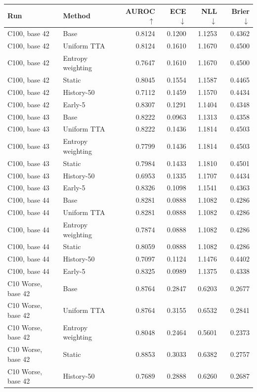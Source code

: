 \begin{tabular}{llrrrr}
\toprule
Run & Method & AUROC $\uparrow$ & ECE $\downarrow$ & NLL $\downarrow$ & Brier $\downarrow$ \\
\midrule
C100, base 42 & Base & 0.8124 & 0.1200 & 1.1253 & 0.4362 \\
C100, base 42 & Uniform TTA & 0.8124 & 0.1610 & 1.1670 & 0.4500 \\
C100, base 42 & Entropy weighting & 0.7647 & 0.1610 & 1.1670 & 0.4500 \\
C100, base 42 & Static & 0.8045 & 0.1554 & 1.1587 & 0.4465 \\
C100, base 42 & History-50 & 0.7112 & 0.1459 & 1.1570 & 0.4434 \\
C100, base 42 & Early-5 & 0.8307 & 0.1291 & 1.1404 & 0.4348 \\
C100, base 43 & Base & 0.8222 & 0.0963 & 1.1313 & 0.4358 \\
C100, base 43 & Uniform TTA & 0.8222 & 0.1436 & 1.1814 & 0.4503 \\
C100, base 43 & Entropy weighting & 0.7799 & 0.1436 & 1.1814 & 0.4503 \\
C100, base 43 & Static & 0.7984 & 0.1433 & 1.1810 & 0.4501 \\
C100, base 43 & History-50 & 0.6953 & 0.1335 & 1.1707 & 0.4434 \\
C100, base 43 & Early-5 & 0.8326 & 0.1098 & 1.1541 & 0.4363 \\
C100, base 44 & Base & 0.8281 & 0.0888 & 1.1082 & 0.4286 \\
C100, base 44 & Uniform TTA & 0.8281 & 0.0888 & 1.1082 & 0.4286 \\
C100, base 44 & Entropy weighting & 0.7874 & 0.0888 & 1.1082 & 0.4286 \\
C100, base 44 & Static & 0.8059 & 0.0888 & 1.1082 & 0.4286 \\
C100, base 44 & History-50 & 0.7097 & 0.1124 & 1.1476 & 0.4402 \\
C100, base 44 & Early-5 & 0.8325 & 0.0989 & 1.1375 & 0.4338 \\
C10 Worse, base 42 & Base & 0.8764 & 0.2847 & 0.6203 & 0.2677 \\
C10 Worse, base 42 & Uniform TTA & 0.8764 & 0.3155 & 0.6532 & 0.2841 \\
C10 Worse, base 42 & Entropy weighting & 0.8048 & 0.2464 & 0.5601 & 0.2373 \\
C10 Worse, base 42 & Static & 0.8853 & 0.3033 & 0.6382 & 0.2757 \\
C10 Worse, base 42 & History-50 & 0.7689 & 0.2888 & 0.6260 & 0.2687 \\

\end{tabular}
